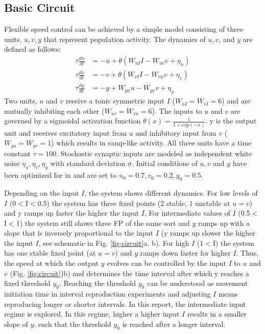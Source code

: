 \documentclass[9pt]{article}
\begin{document}
\subsection{Basic Circuit}
Flexible speed control can be achieved by a simple model consisting of three units, $u, v, y$ that represent population activity. 
The dynamics of $u, v$, and $y$ are defined as follows:
\begin{equation} \label{circuit}
	\begin{split}
	\tau\frac{du}{dt} & = -u + \theta(W_{uI}I - W_{uv}v + \eta_u) \\
	\tau\frac{dv}{dt} & = -v + \theta(W_{vI}I - W_{vu}v + \eta_v) \\
	\tau\frac{dy}{dt} & = -y + W_{yu}u - W_{yv}v + \eta_y
	\end{split}
\end{equation}
Two units, $u$ and $v$ receive a tonic symmetric input $I$ ($W_{uI}=W_{vI}=6$) and are mutually inhibiting each other ($W_{uv}=W_{vu}=6$). 
The inputs to $u$ and $v$ are governed by a sigmoidal activation function $\theta(x) = \frac{1}{1+exp(-x)}$.
y is the output unit and receives excitatory input from $u$ and inhibitory input from $v$ ($W_{yu}=W_{yv}=1$) which results in ramp-like activity.
All three units have a time constant $\tau = 100$. 
Stochastic synaptic inputs are modeled as independent white noise $\eta_u, \eta_v, \eta_y$ with standard deviation $\sigma$.
Initial conditions of $u, v$ and $y$ have been optimized for in \cite{Egger2020} and are set to $u_0=0.7 , v_0=0.2 , y_0=0.5$.

Depending on the input $I$, the system shows different dynamics. For low levels of $I$ (0$<$I$<$0.5) the system has three fixed points (2 stable, 1 unstable at $u=v$) and y ramps up faster the higher the input $I$. 
For intermediate values of $I$ (0.5$<$I$<$1) the system still shows three FP of the same sort and $y$ ramps up with a slope that is inversely proportional to the input $I$ (y ramps up slower the higher the input $I$, see schematic in Fig. \ref{fig:circuit}a, b). 
For high $I$ (1$<$I) the system has one stable fixed point (at $u=v$) and $y$ ramps down faster for higher $I$.
Thus, the speed at which the output $y$ evolves can be controlled by the input $I$ to $u$ and $v$ (Fig. \ref{fig:circuit})b) and determines the time interval after which y reaches a fixed threshold $y_0$. 
Reaching the threshold $y_0$ can be understood as movement initiation time in interval reproduction experiments and adjusting $I$ means reproducing longer or shorter intervals.
In this report, the intermediate input regime is explored. In this regime, higher a higher input $I$ results in a smaller slope of $y$, such that the threshold $y_0$ is reached after a longer interval.
\end{document}
